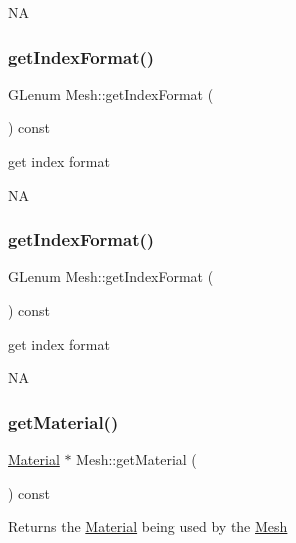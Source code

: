 NA \mbox{\label{classMesh_a1d23b78ab2e51b134ae79acd2754f45c}} 
\subsubsection{\texorpdfstring{get\+Index\+Format()}{getIndexFormat()}\hspace{0.1cm}{\footnotesize\ttfamily [1/2]}}
{\footnotesize\ttfamily G\+Lenum Mesh\+::get\+Index\+Format (\begin{DoxyParamCaption}{ }\end{DoxyParamCaption}) const}

get index format

NA \mbox{\label{classMesh_a1d23b78ab2e51b134ae79acd2754f45c}} 
\subsubsection{\texorpdfstring{get\+Index\+Format()}{getIndexFormat()}\hspace{0.1cm}{\footnotesize\ttfamily [2/2]}}
{\footnotesize\ttfamily G\+Lenum Mesh\+::get\+Index\+Format (\begin{DoxyParamCaption}{ }\end{DoxyParamCaption}) const}

get index format

NA \mbox{\label{classMesh_ad0815fc310ab9de09381978871f2bc77}} 
\subsubsection{\texorpdfstring{get\+Material()}{getMaterial()}\hspace{0.1cm}{\footnotesize\ttfamily [1/2]}}
{\footnotesize\ttfamily \hyperlink{classMaterial}{Material} $\ast$ Mesh\+::get\+Material (\begin{DoxyParamCaption}{ }\end{DoxyParamCaption}) const}

Returns the \hyperlink{classMaterial}{Material} being used by the \hyperlink{classMesh}{Mesh} \mbox{\label{classMesh_a848b58b9b1c49199da9fbc41b444be1d}} 
